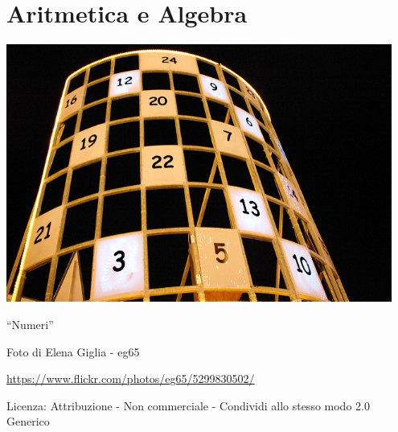 \part{Aritmetica e Algebra}

\includegraphics[width=0.95\textwidth]{img/numeri.jpg}
  \begin{center}
    {\large ``Numeri''}\par
    Foto di Elena Giglia - eg65\par
    \url{https://www.flickr.com/photos/eg65/5299830502/}\par
    Licenza: Attribuzione - Non commerciale - Condividi allo stesso modo 2.0 Generico\par
  \end{center}
\clearpage
\cleardoublepage
